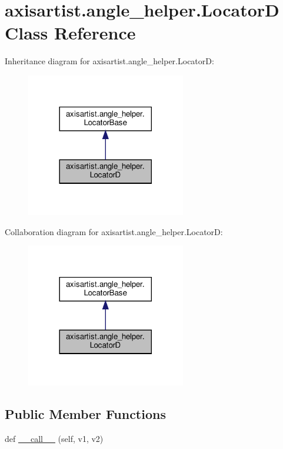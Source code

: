\hypertarget{classaxisartist_1_1angle__helper_1_1LocatorD}{}\section{axisartist.\+angle\+\_\+helper.\+LocatorD Class Reference}
\label{classaxisartist_1_1angle__helper_1_1LocatorD}


Inheritance diagram for axisartist.\+angle\+\_\+helper.\+LocatorD\+:
\nopagebreak
\begin{figure}[H]
\begin{center}
\leavevmode
\includegraphics[width=197pt]{classaxisartist_1_1angle__helper_1_1LocatorD__inherit__graph}
\end{center}
\end{figure}


Collaboration diagram for axisartist.\+angle\+\_\+helper.\+LocatorD\+:
\nopagebreak
\begin{figure}[H]
\begin{center}
\leavevmode
\includegraphics[width=197pt]{classaxisartist_1_1angle__helper_1_1LocatorD__coll__graph}
\end{center}
\end{figure}
\subsection*{Public Member Functions}
\begin{DoxyCompactItemize}
\item 
def \hyperlink{classaxisartist_1_1angle__helper_1_1LocatorD_afc45969f387b7324087abedb9a7b712e}{\+\_\+\+\_\+call\+\_\+\+\_\+} (self, v1, v2)
\end{DoxyCompactItemize}
